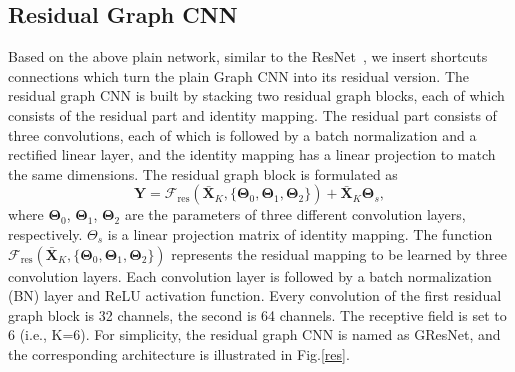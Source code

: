 \documentclass[journal]{IEEEtran}
\begin{document}
\subsection{Residual Graph CNN }
Based on the above plain network, similar to the ResNet~\cite{resnet}, we insert shortcuts connections which turn the plain Graph CNN into its residual version.
The residual graph CNN is built by stacking two residual graph blocks, each of which consists of the residual part and identity mapping.
The residual part consists of three convolutions, each of which is followed by a batch normalization and a rectified linear layer, and the identity mapping has a linear projection to match the same dimensions.
The residual graph block is formulated as
\begin{equation}
\mathbf{Y} = \mathcal{F}_{\text{res}}(\mathbf{\bar{X}}_K, \{\mathbf{\Theta}_{0}, \mathbf{\Theta}_{1}, \mathbf{\Theta}_{2}\})
+
\mathbf{\bar{X}}_K\mathbf{\Theta}_{s},
\label{res}
\end{equation}
where $\mathbf{\Theta}_{0}$, $\mathbf{\Theta}_{1}$, $\mathbf{\Theta}_{2}$ are the parameters of three different convolution layers, respectively. $\Theta_{s}$ is a linear projection matrix of identity mapping. The function $\mathcal{F}_{\text{res}}(\mathbf{\bar{X}}_K, \{\mathbf{\Theta}_{0}, \mathbf{\Theta}_{1}, \mathbf{\Theta}_{2}\})$ represents the residual mapping to be learned by three convolution layers. Each convolution layer is followed by a batch normalization (BN) layer and ReLU activation function.
Every convolution of the first residual graph block is 32 channels, the second is 64 channels. The receptive field is set to 6 (i.e., K=6). For simplicity, the residual graph CNN is named as G\underline{\hspace{0.5em}}ResNet, and the corresponding architecture is illustrated in Fig.\ref{res}.
\end{document}

